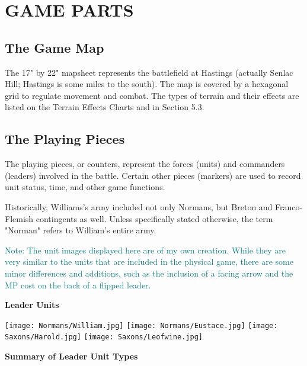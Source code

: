 \section{GAME PARTS}

\subsection{The Game Map}

The 17" by 22" mapsheet represents the battlefield at Hastings (actually Senlac Hill; Hastings is some miles to the south). The map is covered by a hexagonal grid to regulate movement and combat. The types of terrain and their effects are listed on the Terrain Effects Charts and in Section 5.3.

\subsection{The Playing Pieces}

The playing pieces, or counters, represent the forces (units) and commanders (leaders) involved in the battle. Certain other pieces (markers) are used to record unit status, time, and other game functions.

Historically, Williams's army included not only Normans, but Breton and Franco-Flemish contingents as well. Unless specifically stated otherwise, the term "Norman" refers to William's entire army.

\textcolor{teal}{Note: The unit images displayed here are of my own creation. While they are very similar to the units that are included in the physical game, there are some minor differences and additions, such as the inclusion of a facing arrow and the MP cost on the back of a flipped leader.}

\begin{center}
\textbf{Leader Units}
\end{center}
\par
\hspace{1em}
\texttt{[image: Normans/William.jpg]}
\hspace{1em}
\texttt{[image: Normans/Eustace.jpg]}
\hspace{1em}
\texttt{[image: Saxons/Harold.jpg]}
\hspace{1em}
\texttt{[image: Saxons/Leofwine.jpg]}

\renewcommand\tabularxcolumn[1]{m{#1}}

\par
\begin{center}
  \textbf{Summary of Leader Unit Types}
  \break
\end{center}

